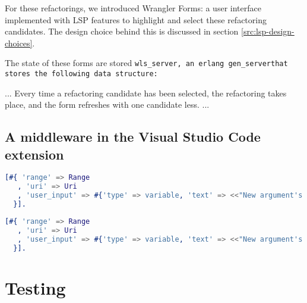 For these refactorings, we introduced Wrangler Forms: a user interface implemented with LSP features to highlight and select these refactoring candidates. The design choice behind this is discussed in section \ref{src:lsp-design-choices}.

The state of these forms are stored \tt wls\_server\rm , an erlang \tt gen\_server\rm that stores the following data structure:


...
Every time a refactoring candidate has been selected, the refactoring takes place, and the form refreshes with one candidate less.
...

\label{src:behaviours}

\subsection{A middleware in the Visual Studio Code extension}
\label{src:middleware}


\begin{lstlisting}[language=erlang]
  [#{ 'range' => Range
   , 'uri' => Uri
   , 'user_input' => #{'type' => variable, 'text' => <<"New argument's name">>}
  }].
\end{lstlisting}

\begin{lstlisting}[language=erlang]
  [#{ 'range' => Range
   , 'uri' => Uri
   , 'user_input' => #{'type' => variable, 'text' => <<"New argument's name">>, 'value' => <<"NewVar">>}
  }].
\end{lstlisting}


\section{Testing}
